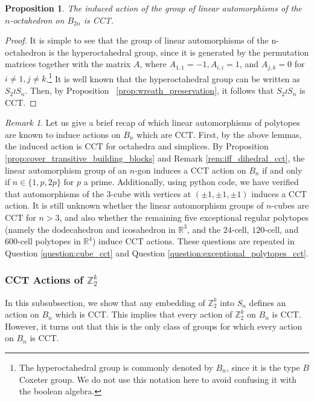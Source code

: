 \documentclass[smallextended, envcountsame, numbook]{svjour3}
\theoremstyle{plain}
\newtheorem{prop}[thm]{Proposition}
\theoremstyle{definition}
\theoremstyle{remark}
\newtheorem{rmk}[thm]{Remark}
\numberwithin{equation}{section}
\newcommand\sssec{\subsubsection}
\begin{document}
\begin{prop}
The induced action of the group of linear automorphisms of the $n$-octahedron on $B_{2n}$ is CCT.
\end{prop}
\begin{proof}
It is simple to see that the group of linear automorphisms of the n-octahedron is the hyperoctahedral group, since it is generated by the permutation matrices together with the matrix $A$, where $A_{1,1} = -1,A_{i,i} = 1$, and $A_{j,k} = 0$ for $i \neq 1, j \neq k$.\footnote{The hyperoctahedral group is commonly denoted by $B_n$, since it is the type $B$ Coxeter group. We do not use this notation here to avoid confusing it with the boolean algebra.} It is well known that the hyperoctahedral group can be written as $S_2 \wr S_n$. Then, by Proposition ~\ref{prop:wreath_preservation}, it follows that $S_2 \wr S_n$ is CCT.
\end{proof}

\begin{rmk}
Let us give a brief recap of which linear automorphisms of polytopes are known to induce actions on $B_n$ which are CCT. First, by the above lemmas, the induced action is CCT for octahedra and simplices. By Proposition  \ref{prop:cover_transitive_building_blocks} and Remark \ref{rem:iff_dihedral_cct}, the linear automorphism group of an $n$-gon induces a CCT action on $B_n$ if and only if $n\in \{1,p,2p\}$ for $p$ a prime. Additionally, using python code, we have verified that automorphisms of the 3-cube with vertices at $(\pm 1,\pm 1,\pm 1)$ induces a CCT action. It is still unknown whether the linear automorphism groups of $n$-cubes are CCT for $n> 3$, and also whether the remaining five exceptional regular polytopes (namely the dodecahedron and icosahedron in $\mathbb R^3$, and the $24$-cell, $120$-cell, and $600$-cell polytopes in $\mathbb R^4$) induce CCT actions. These questions are repeated in Question \ref{question:cube_cct} and Question \ref{question:exceptional_polytopes_cct}.

\end{rmk}

\sssec{CCT Actions of $\mathbb Z_2^k$}

In this subsubsection, we show that any embedding of $\mathbb Z_2^k$ into $S_n$ defines an action on $B_n$ which is CCT.  This implies that every action of $\mathbb Z_2^k$ on $B_n$ is CCT. However, it turns out that this is the only class of groups for which every action on $B_n$ is CCT.
\end{document}
